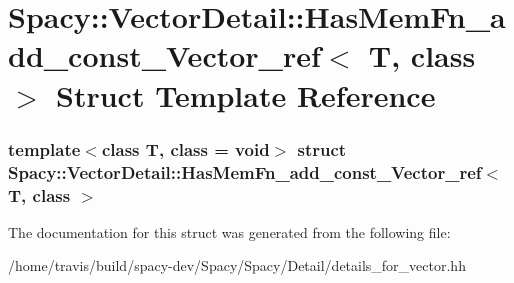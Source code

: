 \hypertarget{structSpacy_1_1VectorDetail_1_1HasMemFn__add__const__Vector__ref}{\section{\-Spacy\-:\-:\-Vector\-Detail\-:\-:\-Has\-Mem\-Fn\-\_\-add\-\_\-const\-\_\-\-Vector\-\_\-ref$<$ \-T, class $>$ \-Struct \-Template \-Reference}
\label{structSpacy_1_1VectorDetail_1_1HasMemFn__add__const__Vector__ref}
}
\subsubsection*{template$<$class T, class = void$>$ struct Spacy\-::\-Vector\-Detail\-::\-Has\-Mem\-Fn\-\_\-add\-\_\-const\-\_\-\-Vector\-\_\-ref$<$ T, class $>$}



\-The documentation for this struct was generated from the following file\-:\begin{DoxyCompactItemize}
\item 
/home/travis/build/spacy-\/dev/\-Spacy/\-Spacy/\-Detail/details\-\_\-for\-\_\-vector.\-hh\end{DoxyCompactItemize}
